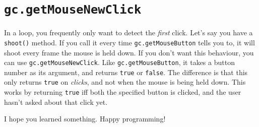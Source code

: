 \documentclass{article}
\begin{document}
\section*{\texttt{gc.getMouseNewClick}}
In a loop, you frequently only want to detect the \textit{first} click. Let's say you have a \texttt{shoot()} method. If you call it every time \texttt{gc.getMouseButton} tells you to, it will shoot every frame the mouse is held down. If you don't want this behaviour, you can use \texttt{gc.getMouseNewClick}. Like \texttt{gc.getMouseButton}, it takes a button number as its argument, and returns \texttt{true} or \texttt{false}. The difference is that this only returns \texttt{true} on \textit{clicks}, and not when the mouse is being held down. This works by returning \texttt{true} iff both the specified button is clicked, and the user hasn't asked about that click yet.

\bigskip
\bigskip
\noindent
I hope you learned something. Happy programming!
\end{document}
